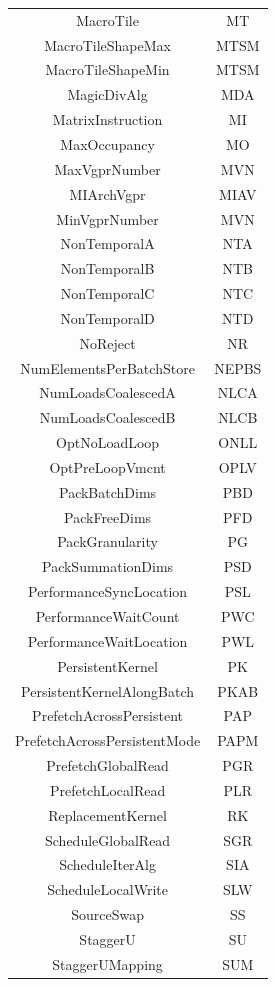 \documentclass[]{article}
\begin{document}
\begin{center}
\begin{small}
\begin{longtable}{ |c|c| }
 MacroTile & MT \\
 MacroTileShapeMax & MTSM \\
 MacroTileShapeMin & MTSM \\
 MagicDivAlg & MDA \\
 MatrixInstruction & MI \\
 MaxOccupancy & MO \\
 MaxVgprNumber & MVN \\
 MIArchVgpr & MIAV \\
 MinVgprNumber & MVN \\
 NonTemporalA & NTA \\
 NonTemporalB & NTB \\
 NonTemporalC & NTC \\
 NonTemporalD & NTD \\
 NoReject & NR \\
 NumElementsPerBatchStore & NEPBS \\
 NumLoadsCoalescedA & NLCA \\
 NumLoadsCoalescedB & NLCB \\
 OptNoLoadLoop & ONLL \\
 OptPreLoopVmcnt & OPLV \\
 PackBatchDims & PBD \\
 PackFreeDims & PFD \\
 PackGranularity & PG \\
 PackSummationDims & PSD \\
 PerformanceSyncLocation & PSL \\
 PerformanceWaitCount & PWC \\
 PerformanceWaitLocation & PWL \\
 PersistentKernel & PK \\
 PersistentKernelAlongBatch & PKAB \\
 PrefetchAcrossPersistent & PAP \\
 PrefetchAcrossPersistentMode & PAPM \\
 PrefetchGlobalRead & PGR \\
 PrefetchLocalRead & PLR \\
 ReplacementKernel & RK \\
 ScheduleGlobalRead & SGR \\
 ScheduleIterAlg & SIA \\
 ScheduleLocalWrite & SLW \\
 SourceSwap & SS \\
 StaggerU & SU \\
 StaggerUMapping & SUM \\

\end{longtable}
\end{small}
\end{center}
\end{document}
